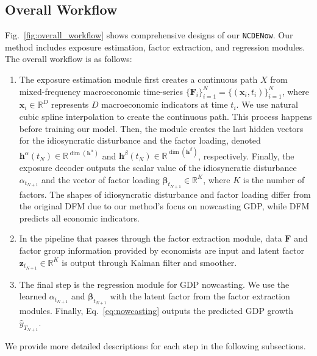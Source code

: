 \documentclass[sigconf]{acmart}
\begin{document}
\subsection{Overall Workflow}
Fig.~\ref{fig:overall_workflow} shows comprehensive designs of our \texttt{NCDENow}. Our method includes exposure estimation, factor extraction, and regression modules. The overall workflow is as follows:
\begin{enumerate}
    \item The exposure estimation module first creates a continuous path $X$ from mixed-frequency macroeconomic time-series $\{\mathbf{F}_i\}^{N}_{i=1}=\{(\mathbf{x}_i,t_i)\}^{N}_{i=1}$, where $\textbf{x}_i\in \mathbb{R}^{D}$ represents $D$ macroeconomic indicators at time $t_i$. We use natural cubic spline interpolation to create the continuous path. This process happens before training our model. Then, the module creates the last hidden vectors for the idiosyncratic disturbance and the factor loading, denoted $\mathbf{h}^{\alpha}(t_N)\in \mathbb{R}^{\dim(\mathbf{h}^{\alpha})}$ and $\mathbf{h}^{\beta}(t_N)\in \mathbb{R}^{\dim(\mathbf{h}^{\beta})}$, respectively.
    Finally, the exposure decoder outputs the scalar value of the idiosyncratic disturbance $\alpha_{t_{N+1}}$ and the vector of factor loading $\mathbf{\bm{\beta}}_{t_{N+1}} \in \mathbb{R}^{K}$, where $K$ is the number of factors.
    The shapes of idiosyncratic disturbance and factor loading differ from the original DFM due to our method's focus on nowcasting GDP, while DFM predicts all economic indicators.
    \item In the pipeline that passes through the factor extraction module, data $\mathbf{F}$ and factor group information provided by economists are input and latent factor $\mathbf{z}_{t_{N+1}}\in \mathbb{R}^{K}$ is output through Kalman filter and smoother.
    \item The final step is the regression module for GDP nowcasting. We use the learned $\alpha_{t_{N+1}}$ and $\mathbf{\bm{\beta}}_{t_{N+1}}$ with the latent factor from the factor extraction modules. Finally, Eq.~\eqref{eq:nowcasting} outputs the predicted GDP growth $\hat{y}_{T_{N+1}}$.
\end{enumerate}

We provide more detailed descriptions for each step in the following subsections.
\end{document}
